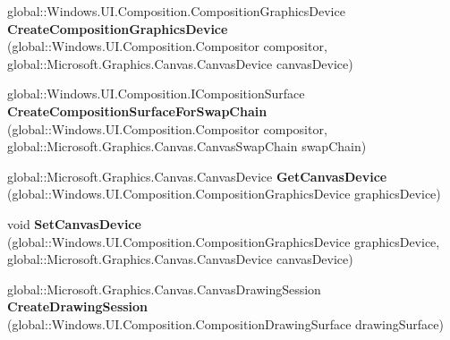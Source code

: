 \begin{DoxyCompactItemize}
global\+::\+Windows.\+U\+I.\+Composition.\+Composition\+Graphics\+Device {\bfseries Create\+Composition\+Graphics\+Device} (global\+::\+Windows.\+U\+I.\+Composition.\+Compositor compositor, global\+::\+Microsoft.\+Graphics.\+Canvas.\+Canvas\+Device canvas\+Device)
\item 
\mbox{\label{interface_microsoft_1_1_graphics_1_1_canvas_1_1_u_i_1_1_composition_1_1_i_canvas_composition_statics_a6803bff12a2a0f2d9c35cdac60868b7b}} 
global\+::\+Windows.\+U\+I.\+Composition.\+I\+Composition\+Surface {\bfseries Create\+Composition\+Surface\+For\+Swap\+Chain} (global\+::\+Windows.\+U\+I.\+Composition.\+Compositor compositor, global\+::\+Microsoft.\+Graphics.\+Canvas.\+Canvas\+Swap\+Chain swap\+Chain)
\item 
\mbox{\label{interface_microsoft_1_1_graphics_1_1_canvas_1_1_u_i_1_1_composition_1_1_i_canvas_composition_statics_ad6745a005de8b7c161ff1c151591a3bb}} 
global\+::\+Microsoft.\+Graphics.\+Canvas.\+Canvas\+Device {\bfseries Get\+Canvas\+Device} (global\+::\+Windows.\+U\+I.\+Composition.\+Composition\+Graphics\+Device graphics\+Device)
\item 
\mbox{\label{interface_microsoft_1_1_graphics_1_1_canvas_1_1_u_i_1_1_composition_1_1_i_canvas_composition_statics_a3fce2ed9ef29897b92f51b815d0c42d7}} 
void {\bfseries Set\+Canvas\+Device} (global\+::\+Windows.\+U\+I.\+Composition.\+Composition\+Graphics\+Device graphics\+Device, global\+::\+Microsoft.\+Graphics.\+Canvas.\+Canvas\+Device canvas\+Device)
\item 
\mbox{\label{interface_microsoft_1_1_graphics_1_1_canvas_1_1_u_i_1_1_composition_1_1_i_canvas_composition_statics_a742fc5f5398406c730e6f87b2755b86a}} 
global\+::\+Microsoft.\+Graphics.\+Canvas.\+Canvas\+Drawing\+Session {\bfseries Create\+Drawing\+Session} (global\+::\+Windows.\+U\+I.\+Composition.\+Composition\+Drawing\+Surface drawing\+Surface)
\item 
\mbox{\label{interface_microsoft_1_1_graphics_1_1_canvas_1_1_u_i_1_1_composition_1_1_i_canvas_composition_statics_a3be55117be22745ae6372f082447a79b}} 

\end{DoxyCompactItemize}
